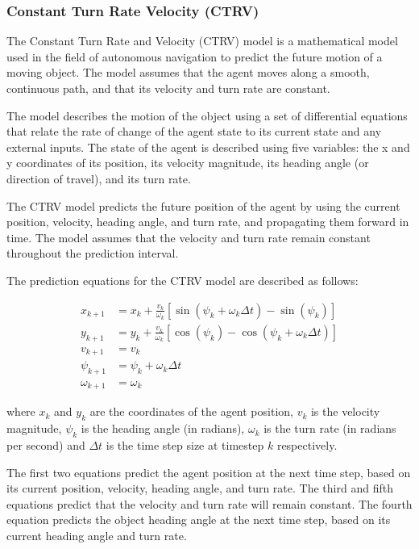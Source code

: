 \subsubsection{Constant Turn Rate Velocity (CTRV)}
\label{subsubsec:3_CTRV}

The Constant Turn Rate and Velocity (CTRV) model is a mathematical model used in the field of autonomous navigation to predict the future motion of a moving object. The model assumes that the agent moves along a smooth, continuous path, and that its velocity and turn rate are constant.

The model describes the motion of the object using a set of differential equations that relate the rate of change of the agent state to its current state and any external inputs. The state of the agent is described using five variables: the x and y coordinates of its position, its velocity magnitude, its heading angle (or direction of travel), and its turn rate.

The CTRV model predicts the future position of the agent by using the current position, velocity, heading angle, and turn rate, and propagating them forward in time. The model assumes that the velocity and turn rate remain constant throughout the prediction interval.

The prediction equations for the CTRV model are described as follows:

\begin{equation}
\begin{split}
	x_{k+1} &= x_k + \frac{v_k}{\omega_k}\left[\sin(\psi_k+\omega_k\Delta t)-\sin(\psi_k)\right] \\
	y_{k+1} &= y_k + \frac{v_k}{\omega_k}\left[\cos(\psi_k)-\cos(\psi_k+\omega_k\Delta t)\right] \\
	v_{k+1} &= v_k \\
	\psi_{k+1} &= \psi_k + \omega_k\Delta t \\
	\omega_{k+1} &= \omega_k
\end{split}
\end{equation}
	
where $x_k$ and $y_k$ are the coordinates of the agent position, $v_k$ is the velocity magnitude, $\psi_k$ is the heading angle (in radians), $\omega_k$ is the turn rate (in radians per second) and $\Delta t$ is the time step size at timestep $k$ respectively.

The first two equations predict the agent position at the next time step, based on its current position, velocity, heading angle, and turn rate. The third and fifth equations predict that the velocity and turn rate will remain constant. The fourth equation predicts the object heading angle at the next time step, based on its current heading angle and turn rate.

